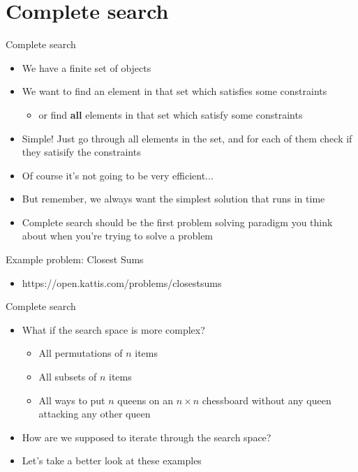 \documentclass[10pt]{beamer}
\newcommand{\bi}{\begin{itemize}}
\newcommand{\ei}{\end{itemize}}
\begin{document}
\section{Complete search}
\begin{frame}{Complete search}
    \bi
        \item We have a finite set of objects
        \item We want to find an element in that set which satisfies some constraints
            \bi
                \item or find \textbf{all} elements in that set which satisfy some constraints
            \ei

        \vspace{5pt}
        \item Simple! Just go through all elements in the set, and for each of them check if they satisify the constraints
        \item Of course it's not going to be very efficient...
        \item But remember, we always want the simplest solution that runs in time
        \item Complete search should be the first problem solving paradigm you think about when you're trying to solve a problem
    \ei
\end{frame}

\begin{frame}{Example problem: Closest Sums}
    \bi
        \item https://open.kattis.com/problems/closestsums
    \ei
\end{frame}

\begin{frame}{Complete search}
    \bi
        \item What if the search space is more complex?
            \bi
                \item All permutations of $n$ items
                \item All subsets of $n$ items
                \item All ways to put $n$ queens on an $n\times n$ chessboard without any queen attacking any other queen
            \ei
        \item How are we supposed to iterate through the search space?
        \item Let's take a better look at these examples
    \ei
\end{frame}
\end{document}
